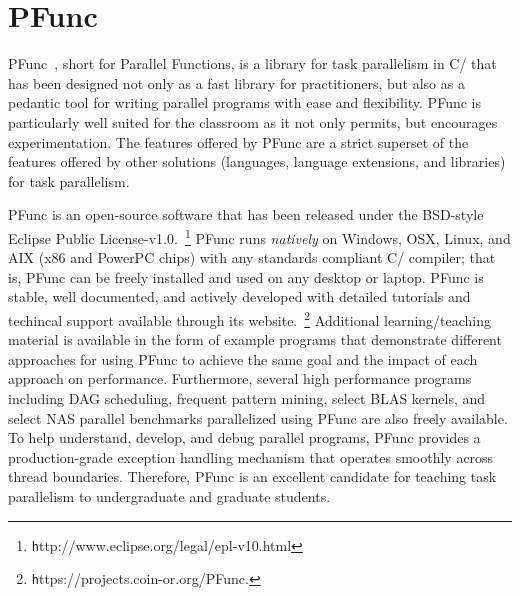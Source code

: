 \documentclass[9pt,twocolumn,letter]{article}
\begin{document}
%
%
%
\section{PFunc}
\label{sec:pfunc}
PFunc~\cite{kambadur09:pfunc}, short for Parallel Functions, is a library for
task parallelism in C/\Cpp{} that has been designed not only as a fast library
for practitioners, but also as a pedantic tool for writing parallel programs
with ease and flexibility.
%
PFunc is particularly well suited for the classroom as it not only permits, but
encourages experimentation.
%
The features offered by PFunc are a strict superset of the features offered by
other solutions (languages, language extensions, and libraries) for task
parallelism.

%
%
PFunc is an open-source software that has been released under the BSD-style
Eclipse Public License-v1.0.~\footnote{\texttt
http://www.eclipse.org/legal/epl-v10.html}
%
PFunc runs \textit{natively} on Windows, OSX, Linux, and AIX (x86 and
PowerPC chips) with any standards compliant C/\Cpp{} compiler; that is, PFunc
can be freely installed and used on any desktop or laptop.
%
PFunc is stable, well documented, and actively developed with detailed
tutorials and techincal support available through its
website.~\footnote{\texttt https://projects.coin-or.org/PFunc.}
%
Additional learning/teaching material is available in the form of example
programs that demonstrate different approaches for using PFunc to achieve the
same goal and the impact of each approach on performance.
%
Furthermore, several high performance programs including DAG scheduling,
frequent pattern mining, select BLAS kernels, and select NAS parallel
benchmarks parallelized using PFunc are also freely available.
%
To help understand, develop, and debug parallel programs, PFunc provides a
production-grade exception handling mechanism that operates smoothly across
thread boundaries.
%
Therefore, PFunc is an excellent candidate for teaching task parallelism to 
undergraduate and graduate students.
\end{document}
